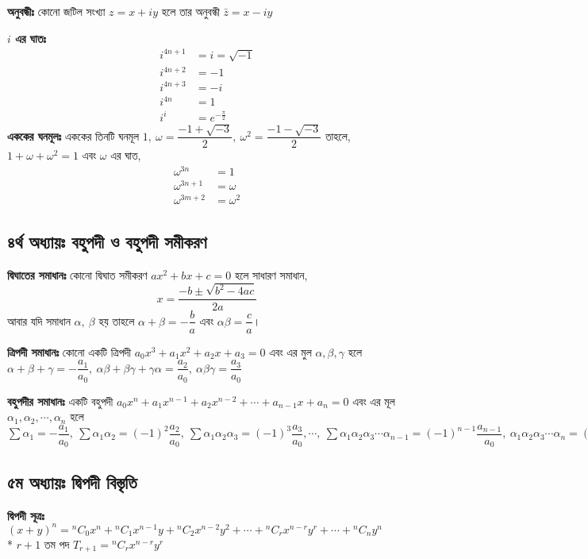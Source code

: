 \documentclass[a4paper,12pt]{article}
\newcommand{\dd}{\displaystyle}
\newcommand*{\comb}[2]{{}^{#1}C_{#2}}%
\begin{document}
\textbf{অনুবন্ধীঃ} কোনো জটিল সংখ্যা $z=x+iy$ হলে তার অনুবন্ধী $\bar{z}=x-iy$

\textbf{$i$ এর ঘাতঃ} \begin{align*}
    i^{4n+1} &= i = \sqrt{-1}\\
    i^{4n+2} &= -1 \\
    i^{4n+3} &= -i \\
    i^{4n} &= 1 \\
    i^i &= e^{-\frac{\pi}{2}}
\end{align*}
\textbf{এককের ঘনমূলঃ} এককের তিনটি ঘনমূল $1,\  \omega = \dfrac{-1 + \sqrt{-3}}{2}, \ \omega^2 = \dfrac{-1 - \sqrt{-3}}{2}$ তাহলে, $1+\omega + \omega^2=1$ এবং $\omega$ এর ঘাত,
\begin{align*}
    \omega^{3n} &= 1\\
    \omega^{3n+1} &= \omega \\
    \omega^{3m+2} &= \omega^2
\end{align*}

\subsection{৪র্থ অধ্যায়ঃ বহুপদী ও বহুপদী সমীকরণ}

\textbf{দ্বিঘাতের সমাধানঃ} কোনো দ্বিঘাত সমীকরণ $ax^2+bx+c=0$ হলে সাধারণ সমাধান, 
\[x=\dfrac{-b \pm \sqrt{b^2-4ac}}{2a}\]
আবার যদি সমাধান $\alpha, \ \beta $ হয় তাহলে $\alpha + \beta = -\dfrac{b}{a}$ এবং $\alpha \beta = \dfrac{c}{a}$। 

\textbf{ত্রিপদী সমাধানঃ} কোনো একটি ত্রিপদী $a_0x^3+a_1x^2+a_2x+a_3=0$ এবং এর মুল $\alpha, \beta, \gamma$ হলে $\alpha + \beta + \gamma = -\dfrac{a_1}{a_0}, \ \alpha \beta + \beta \gamma + \gamma \alpha = \dfrac{a_2}{a_0}, \ \alpha \beta \gamma = \dfrac{a_3}{a_0}$ 

\textbf{বহুপদীর সমাধানঃ} একটি বহুপদী $a_0x^n+a_1x^{n-1}+a_2x^{n-2}+\cdots+a_{n-1}x+a_n=0$ এবং এর মূল $\alpha_1, \alpha_2, \cdots, \alpha_n$ হলে $\dd \sum \alpha_1 = -\dfrac{a_1}{a_0}, \ \sum \alpha_1 \alpha_2= (-1)^2  \dfrac{a_2}{a_0}, \ \sum \alpha_1 \alpha_2 \alpha_3= (-1)^3  \dfrac{a_3}{a_0}, \cdots, \ \sum \alpha_1 \alpha_2 \alpha_3 \cdots \alpha_{n-1} =(-1)^{n-1}  \dfrac{a_{n-1}}{a_0}, \ \alpha_1\alpha_2\alpha_3\cdots \alpha_n=(-1)^n \dfrac{a_n}{a_0} $

\subsection{৫ম অধ্যায়ঃ দ্বিপদী বিস্তৃতি} 

\textbf{দ্বিপদী সূত্রঃ} $(x+y)^n= \comb{n}{0} x^n + \comb{n}{1} x^{n-1} y+ \comb{n}{2} x^{n-2} y^2+ \cdots + \comb{n}{r} x^{n-r} y^r + \cdots + \comb{n}{n} y^n$\\*
$r+1$ তম পদ $T_{r+1}=\comb{n}{r} x^{n-r} y^r$
\end{document}
